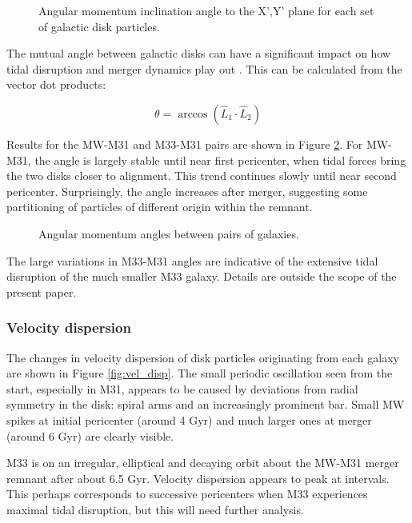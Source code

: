 \documentclass[twocolumn]{aastex63}
\newcommand{\todo}{\color{red}{TODO}\color{black}\hspace{2mm}}
\begin{document}
\begin{figure}[ht!]
	\caption{Angular momentum inclination angle to the X',Y' plane for each set of galactic disk particles.
		\label{fig:inclinations_xy}}
\end{figure}

The mutual angle between galactic disks can have a significant impact on how tidal disruption and merger dynamics play out \todo{ref?}. This can be calculated from the vector dot products:

\[ \theta = \arccos (\hat{L}_1 \cdot \hat{L}_2 ) \]

Results for the MW-M31 and M33-M31 pairs are shown in Figure \ref{fig:inclinations_mutual}. For MW-M31, the angle is largely stable until near first pericenter, when tidal forces bring the two disks closer to alignment. This trend continues slowly until near second pericenter. Surprisingly, the angle increases after merger, suggesting some partitioning of particles of different origin within the remnant. \todo{CHECK THIS AGAIN!}

\begin{figure}[ht!]
	\caption{Angular momentum angles between pairs of galaxies.
		\label{fig:inclinations_mutual}}
\end{figure}

The large variations in M33-M31 angles are indicative of the extensive tidal disruption of the much smaller M33 galaxy. Details are outside the scope of the present paper.

\subsubsection{Velocity dispersion}

The changes in velocity dispersion of disk particles originating from each galaxy are shown in Figure \ref{fig:vel_disp}. The small periodic oscillation seen from the start, especially in M31, appears to be caused by deviations from radial symmetry in the disk: spiral arms and an increasingly prominent bar. Small MW spikes at initial pericenter (around 4 Gyr) and much larger ones at merger (around 6 Gyr) are clearly visible.

M33 is on an irregular, elliptical and decaying orbit about the MW-M31 merger remnant after about 6.5 Gyr. Velocity dispersion appears to peak at intervals. This perhaps corresponds to successive pericenters when M33 experiences maximal tidal disruption, but this will need further analysis.
\end{document}
